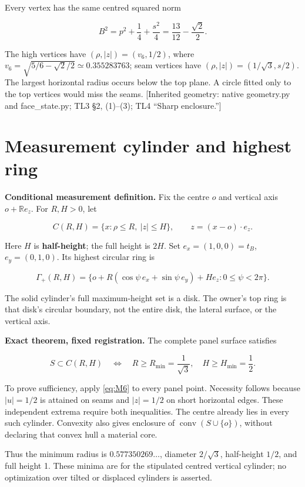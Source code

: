 \documentclass[11pt,a4paper]{article}
\begin{document}
Every vertex has the same centred squared norm

\[
B^2=p^2+\frac14+\frac{s^2}{4}
=\frac{13}{12}-\frac{\sqrt2}{2}.
\tag{M7}\label{eq:M7}
\]

The high vertices have \((\rho,|z|)=(v_6,1/2)\), where \(v_6=\sqrt{5/6-\sqrt2/2}\simeq0.355283763\); seam vertices have \((\rho,|z|)=(1/\sqrt3,s/2)\). The largest horizontal radius occurs below the top plane. A circle fitted only to the top vertices would miss the seams. [Inherited geometry: native geometry.py and face\_\allowbreak{}state.py; TL3 \S{}2, (1)--(3); TL4 \textquotedblleft{}Sharp enclosure.\textquotedblright{}]

\section{Measurement cylinder and highest ring}

\textbf{Conditional measurement definition.} Fix the centre \(o\) and vertical axis \(o+\mathbb R e_z\). For \(R,H>0\), let

\[
\boxed{C(R,H)=\{x:\rho\le R,\ |z|\le H\}},\qquad
z=(x-o)\cdot e_z.
\tag{M8}\label{eq:M8}
\]

Here \(H\) is \textbf{half-height}; the full height is \(2H\). Set \(e_x=(1,0,0)=t_B\), \(e_y=(0,1,0)\). Its highest circular ring is

\[
\boxed{\Gamma_+(R,H)=
\{o+R(\cos\psi\,e_x+\sin\psi\,e_y)+He_z:0\le\psi<2\pi\}.}
\tag{M9}\label{eq:M9}
\]

The solid cylinder's full maximum-height set is a disk. The owner's top ring is that disk's circular boundary, not the entire disk, the lateral surface, or the vertical axis.

\textbf{Exact theorem, fixed registration.} The complete panel surface satisfies

\[
\boxed{S\subset C(R,H)\quad\Longleftrightarrow\quad
R\ge R_{\min}=\frac1{\sqrt3},\quad H\ge H_{\min}=\frac12.}
\tag{M10}\label{eq:M10}
\]

To prove sufficiency, apply \eqref{eq:M6} to every panel point. Necessity follows because \(|u|=1/2\) is attained on seams and \(|z|=1/2\) on short horizontal edges. These independent extrema require both inequalities. The centre already lies in every such cylinder. Convexity also gives enclosure of \(\operatorname{conv}(S\cup\{o\})\), without declaring that convex hull a material core.

Thus the minimum radius is \(0.577350269\ldots\), diameter \(2/\sqrt3\), half-height \(1/2\), and full height 1. These minima are for the stipulated centred vertical cylinder; no optimization over tilted or displaced cylinders is asserted.
\end{document}
